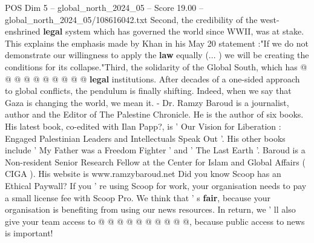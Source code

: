 \begin{textsample}{POS Dim 5 – global\_north\_2024\_05 – Score 19.00 – global\_north\_2024\_05/108616042.txt}
Second, the credibility of the west-enshrined \textbf{legal} system which has governed the world since WWII, was at stake.
This explains the emphasis made by Khan in his May 20 statement :"If we do not demonstrate our willingness to apply the \textbf{law} equally (... ) we will be creating the conditions for its collapse."Third, the solidarity of the Global South, which has @ @ @ @ @ @ @ @ @ @ \textbf{legal} institutions.
After decades of a one-sided approach to global conflicts, the pendulum is finally shifting.
Indeed, when we say that Gaza is changing the world, we mean it. - Dr.
Ramzy Baroud is a journalist, author and the Editor of The Palestine Chronicle.
He is the author of six books.
His latest book, co-edited with Ilan Papp?, is ' Our Vision for Liberation : Engaged Palestinian Leaders and Intellectuals Speak Out '.
His other books include ' My Father was a Freedom Fighter ' and ' The Last Earth '.
Baroud is a Non-resident Senior Research Fellow at the Center for Islam and Global Affairs ( CIGA ).
His website is www.ramzybaroud.net Did you know Scoop has an Ethical Paywall?
If you ' re using Scoop for work, your organisation needs to pay a small license fee with Scoop Pro.
We think that ' s \textbf{fair}, because your organisation is benefiting from using our news resources.
In return, we ' ll also give your team access to @ @ @ @ @ @ @ @ @ @, because public access to news is important!

\end{textsample}
